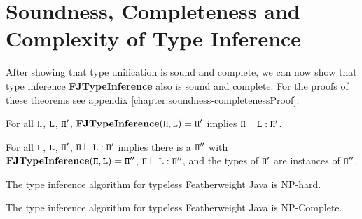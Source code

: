 \section{Soundness, Completeness and Complexity of Type Inference}
\label{sec:soundn-compl-type}

After showing that type unification is sound and complete, we
can now show that type inference \textbf{FJTypeInference} also is
sound and complete.
For the proofs of these theorems see appendix \ref{chapter:soundness-completenessProof}.

\begin{theorem}[Soundness] For all ${\tt \Pi}$, ${\tt L}$, ${\tt \Pi'}$, 
  $\textbf{FJTypeInference}({\tt \Pi},\texttt{L}) = {\tt \Pi}'$ implies ${\tt \Pi} \vdash \texttt{L} : {\tt \Pi}'$.
\end{theorem}
\begin{theorem}[Completeness]  For all ${\tt \Pi}$, ${\tt L}$, ${\tt \Pi'}$,
  ${\tt \Pi} \vdash \texttt{L} : {\tt \Pi}'$ implies there is a
    ${\tt \Pi}''$ with $\textbf{FJTypeInference}({\tt \Pi},\texttt{L}) = {\tt \Pi}''$,
  ${\tt \Pi} \vdash \texttt{L} : {\tt \Pi}''$, and the types of ${\tt \Pi}'$ are
  instances of ${\tt \Pi}''$.
\end{theorem}


\label{sec:complexity}

\begin{theorem}[NP-Hardness]
  \label{theo:np-hardness}
  The type inference algorithm for typeless Featherweight Java is NP-hard.
\end{theorem}


\begin{theorem}[NP-Completeness]
  \label{theo:np-completeness}
  The type inference algorithm for typeless Featherweight Java is NP-Complete.
\end{theorem}


